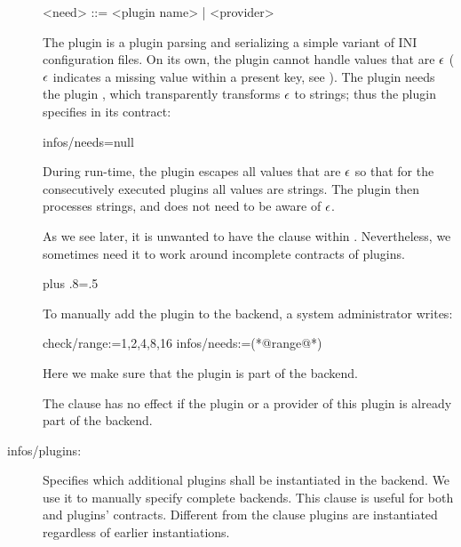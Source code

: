 \begin{description}
\begin{grammar}
<need> ::= <plugin name> | <provider>
\end{grammar}

\begin{example}
The plugin  is a plugin parsing and serializing a simple variant of INI configuration files.
On its own, the plugin cannot handle values that are $\epsilon$ ($\epsilon$ indicates a missing value within a present key, see ).
The plugin  needs the plugin , which transparently transforms $\epsilon$ to strings; thus the plugin  specifies in its contract:

\begin{code}[language=CfgElektra]
infos/needs=null
\end{code}

During run-time, the plugin  escapes all values that are $\epsilon$ so that for the consecutively executed plugins all values are strings.
The plugin  then processes strings, and does not need to be aware of $\epsilon$.
\end{example}

As we see later, it is unwanted to have the clause  within .
Nevertheless, we sometimes need it to work around incomplete contracts of plugins.%
{\parfillskip=0pt plus .8\textwidth \emergencystretch=.5\textwidth \par}

\begin{example}
\label{ex:manual-range}
To manually add the plugin  to the backend, a system administrator writes:

\begin{code}
  check/range:=1,2,4,8,16
  infos/needs:=(*@range@*)
\end{code}

Here we make sure that the plugin  is part of the backend.
\end{example}

The clause  has no effect if the plugin or a provider of this plugin is already part of the backend.

\item[infos/plugins:] Specifies which additional plugins shall be instantiated in the backend.
We use it to manually specify complete backends.
This clause is useful for both  and plugins' contracts.
Different from the clause  plugins are instantiated regardless of earlier instantiations.


\end{description}
